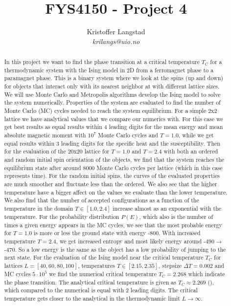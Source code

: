 \documentclass[12pt,a4paper,english]{article}
\title{FYS4150 - Project 4}
\date{}
\author{ Kristoffer Langstad\\ \textit{krilangs@uio.no}}
\begin{document}
\maketitle
\begin{abstract}
In this project we want to find the phase transition at a critical temperature $T_C$ for a thermodynamic system with the Ising model in 2D from a ferromagnet phase to a paramagnet phase. This is a binary system where we look at the spins (up and down) for objects that interact only with its nearest neighbor at with different lattice sizes. We will use Monte Carlo and Metropolis algorithms develop the Ising model to solve the system numerically. Properties of the system are evaluated to find the number of Monte Carlo (MC) cycles needed to reach the system equilibrium. For a simple 2x2 lattice we have analytical values that we compare our numerics with. For this case we get best results as equal results within 4 leading digits for the mean energy and mean absolute magnetic moment with $10^7$ Monte Carlo cycles and $T=1.0$, while we get equal results within 3 leading digits for the specific heat and the susceptibility. Then for the evaluation of the 20x20 lattice for $T=1.0$ and $T=2.4$ with both an ordered and random initial spin orientation of the objects, we find that the system reaches the equilibrium state after around 8000 Monte Carlo cycles per lattice (which in this case represents time). For the random initial spins, the curves of the evaluated properties are much smoother and fluctuate less than the ordered. We also see that the higher temperature have a bigger affect on the values we evaluate than the lower temperature. We also find that the number of accepted configurations as a function of the temperature in the domain $T\in[1.0, 2.4]$ increase almost as an exponential with the temperature. For the probability distribution $P(E)$, which also is the number of times a given energy appears in the MC cycles, we see that the most probable energy for $T=1.0$ is more or less the ground state with energy -800. With increased temperature $T=2.4$, we get increased entropy and most likely energy around -490$\rightarrow$ -470. So a low energy is the same as the object has a low probability of jumping to the next state. For the evaluation of the Ising model near the critical temperature $T_C$ for lattices $L=[40,60,80,100]$, temperatures $T\in[2.15, 2.35]$, stepsize $\Delta T=0.002$ and MC cycles $5\cdot10^5$ we find the numerical critical temperature $T_C=2.268$ which indicate the phase transition. The analytical critical temperature is given as $T_C\approx2.269$ (\citet{PhysRev.65.117}), which compared to the numerical is equal with 2 leading digits. The critical temperature gets closer to the analytical in the thermodynamic limit $L\rightarrow\infty$.
\end{abstract}
\end{document}
